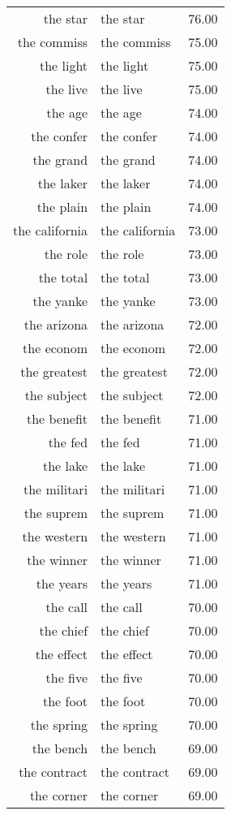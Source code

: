 \begin{table}[ht]
\begin{tabular}{rlr}
  the star & the star & 76.00 \\ 
  the commiss & the commiss & 75.00 \\ 
  the light & the light & 75.00 \\ 
  the live & the live & 75.00 \\ 
  the age & the age & 74.00 \\ 
  the confer & the confer & 74.00 \\ 
  the grand & the grand & 74.00 \\ 
  the laker & the laker & 74.00 \\ 
  the plain & the plain & 74.00 \\ 
  the california & the california & 73.00 \\ 
  the role & the role & 73.00 \\ 
  the total & the total & 73.00 \\ 
  the yanke & the yanke & 73.00 \\ 
  the arizona & the arizona & 72.00 \\ 
  the econom & the econom & 72.00 \\ 
  the greatest & the greatest & 72.00 \\ 
  the subject & the subject & 72.00 \\ 
  the benefit & the benefit & 71.00 \\ 
  the fed & the fed & 71.00 \\ 
  the lake & the lake & 71.00 \\ 
  the militari & the militari & 71.00 \\ 
  the suprem & the suprem & 71.00 \\ 
  the western & the western & 71.00 \\ 
  the winner & the winner & 71.00 \\ 
  the years & the years & 71.00 \\ 
  the call & the call & 70.00 \\ 
  the chief & the chief & 70.00 \\ 
  the effect & the effect & 70.00 \\ 
  the five & the five & 70.00 \\ 
  the foot & the foot & 70.00 \\ 
  the spring & the spring & 70.00 \\ 
  the bench & the bench & 69.00 \\ 
  the contract & the contract & 69.00 \\ 
  the corner & the corner & 69.00 \\ 

\end{tabular}
\end{table}

